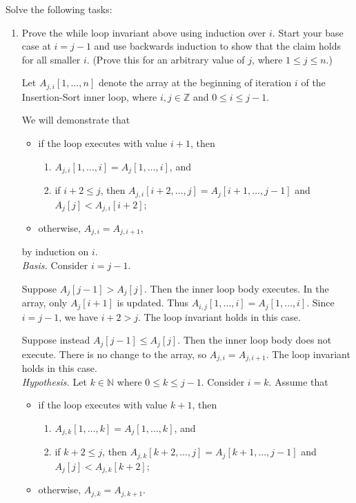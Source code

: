 Solve the following tasks:
\begin{enumerate}
	\item Prove the while loop invariant above using induction over $i$. Start your base case at $i=j-1$ and use backwards induction to show that the claim holds for all smaller $i$. (Prove this for an arbitrary value of $j$,
 where $1 \leq j \leq n$.)
	
\begin{solution}
Let $A_{j,i}[1,\dots,n]$ denote the array at the beginning of iteration $i$ of the Insertion-Sort inner loop, where $i,j\in\mathbb{Z}$ and $0\leq i\leq j-1$.

We will demonstrate that
\begin{itemize}
    \item if the loop executes with value $i+1$, then 
    \begin{enumerate}[nosep]
    \item$A_{j,i}[1,\ldots,i] = A_j[1,\ldots,i]$, and
    \item if $i+2\leq j$, then $A_{j,i}[i+2,\ldots,j] = A_j[i+1,\ldots,j-1]$ and $A_j[j] < A_{j,i}[i+2]$;
\end{enumerate}
\item otherwise, $A_{j,i} = A_{j,i+1}$,
\end{itemize}
by induction on $i$.\\

\textit{Basis. }Consider $i=j-1$.

Suppose $A_j[j-1]>A_j[j]$. Then the inner loop body executes. In the array, only $A_j[i+1]$ is updated. Thus $A_{i,j}[1,\dots,i]=A_j[1,\dots,i]$. Since $i=j-1$, we have $i+2>j$. The loop invariant holds in this case.

Suppose instead $A_j[j-1]\leq A_j[j]$. Then the inner loop body does not execute. There is no change to the array, so $A_{j,i}=A_{j,i+1}$. The loop invariant holds in this case.
\\

\textit{Hypothesis. }Let $k\in\mathbb{N}$ where $0\leq k\leq j-1$. Consider $i=k$. Assume that
\begin{itemize}
    \item if the loop executes with value $k+1$, then 
    \begin{enumerate}[nosep]
    \item$A_{j,k}[1,\ldots,k] = A_j[1,\ldots,k]$, and
    \item if $k+2\leq j$, then $A_{j,k}[k+2,\ldots,j] = A_j[k+1,\ldots,j-1]$ and $A_j[j] < A_{j,k}[k+2]$;
\end{enumerate}
\item otherwise, $A_{j,k} = A_{j,k+1}$.
\end{itemize}


\end{solution}
\end{enumerate}
